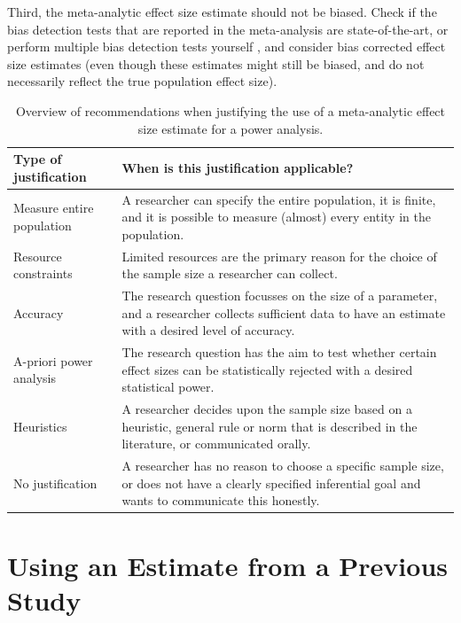 \documentclass[
]{krantz}
\begin{document}
Third, the meta-analytic effect size estimate should not be biased. Check if the bias detection tests that are reported in the meta-analysis are state-of-the-art, or perform multiple bias detection tests yourself \citep{carter_correcting_2019}, and consider bias corrected effect size estimates (even though these estimates might still be biased, and do not necessarily reflect the true population effect size).

\begin{table}

\caption{\label{tab:tablemetajust}Overview of recommendations when justifying the use of a meta-analytic effect size estimate for a power analysis.}
\centering
\begin{tabular}[t]{l|l}
\hline
Type of justification & When is this justification applicable?\\
\hline
Measure entire population & A researcher can specify the entire population, it is finite, and it is possible to measure (almost) every entity in the population.\\
\hline
Resource constraints & Limited resources are the primary reason for the choice of the sample size a researcher can collect.\\
\hline
Accuracy & The research question focusses on the size of a parameter, and a researcher collects sufficient data to have an estimate with a desired level of accuracy.\\
\hline
A-priori power analysis & The research question has the aim to test whether certain effect sizes can be statistically rejected with a desired statistical power.\\
\hline
Heuristics & A researcher decides upon the sample size based on a heuristic, general rule or norm that is described in the literature, or communicated orally.\\
\hline
No justification & A researcher has no reason to choose a specific sample size, or does not have a clearly specified inferential goal and wants to communicate this honestly.\\
\hline
\end{tabular}
\end{table}

\hypertarget{using-an-estimate-from-a-previous-study}{%
\section{Using an Estimate from a Previous Study}\label{using-an-estimate-from-a-previous-study}}
\end{document}
